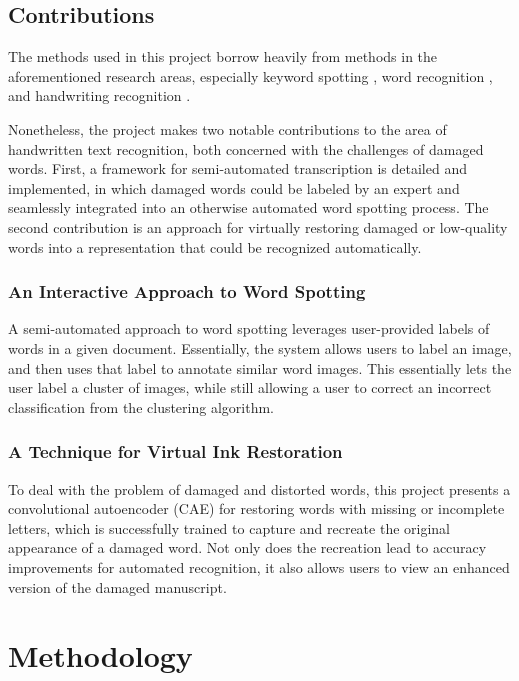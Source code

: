 \documentclass[final]{ukthesis}
\begin{document}
%
%
\section{Contributions}
The methods used in this project borrow heavily from methods in the aforementioned research areas, especially keyword spotting \cite{sharma2015adapting,frinken2012novel}, word recognition \cite{howe2009finding}, and handwriting recognition \cite{fischer2013fast,bluche2013feature}.

Nonetheless, the project makes two notable contributions to the area of handwritten text recognition, both concerned with the challenges of damaged words. First, a framework for semi-automated transcription is detailed and implemented, in which damaged words could be labeled by an expert and seamlessly integrated into an otherwise automated word spotting process. The second contribution is an approach for virtually restoring damaged or low-quality words into a representation that could be recognized automatically.


\subsection{An Interactive Approach to Word Spotting}
A semi-automated approach to word spotting leverages user-provided labels of words in a given document. Essentially, the system allows users to label an image, and then uses that label to annotate similar word images. This essentially lets the user label a cluster of images, while still allowing a user to correct an incorrect classification from the clustering algorithm.


\subsection{A Technique for Virtual Ink Restoration}
To deal with the problem of damaged and distorted words, this project presents a convolutional autoencoder (CAE) for restoring words with missing or incomplete letters, which is successfully trained to capture and recreate the  original appearance of a damaged word. Not only does the recreation lead to accuracy improvements for automated recognition, it also allows users to view an enhanced version of the damaged manuscript.




%
%
%
\chapter{Methodology}
\end{document}
